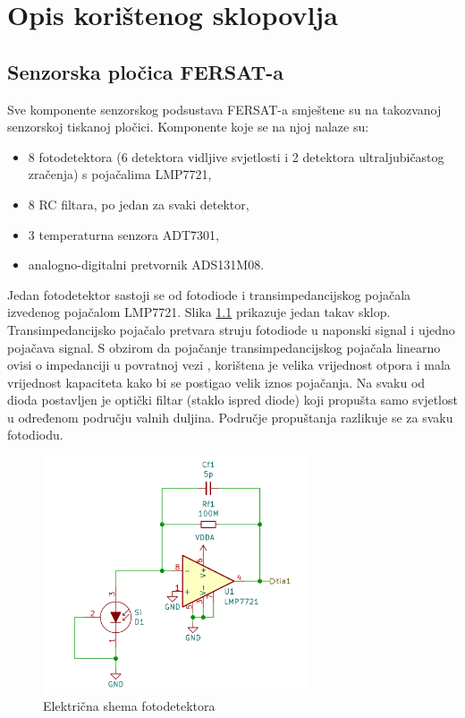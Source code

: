 \chapter{Opis korištenog sklopovlja}

\section{Senzorska pločica FERSAT-a}
Sve komponente senzorskog podsustava FERSAT-a smještene su na takozvanoj senzorskoj tiskanoj pločici. Komponente koje se na njoj nalaze su:
\begin{itemize}
    \item 8 fotodetektora (6 detektora vidljive svjetlosti i 2 detektora ultraljubičastog zračenja) s pojačalima LMP7721,
    \item 8 RC filtara, po jedan za svaki detektor,
    \item 3 temperaturna senzora ADT7301,
    \item analogno-digitalni pretvornik ADS131M08.
\end{itemize}

Jedan fotodetektor sastoji se od fotodiode i transimpedancijskog pojačala izvedenog pojačalom LMP7721. Slika \ref{fig:fotosenzor} prikazuje jedan takav sklop. Transimpedancijsko pojačalo pretvara struju fotodiode u naponski signal i ujedno pojačava signal. S obzirom da pojačanje transimpedancijskog pojačala linearno ovisi o impedanciji u povratnoj vezi \cite{lmp7721_datasheet}, korištena je velika vrijednost otpora i mala vrijednost kapaciteta kako bi se postigao velik iznos pojačanja. Na svaku od dioda postavljen je optički filtar (staklo ispred diode) koji propušta samo svjetlost u određenom području valnih duljina. Područje propuštanja razlikuje se za svaku fotodiodu.

\begin{figure}[h!]
    \centering
    \includegraphics[height=7cm]{slike/fotosenzor.png}
    \caption{Električna shema fotodetektora}
    \label{fig:fotosenzor}
\end{figure}

